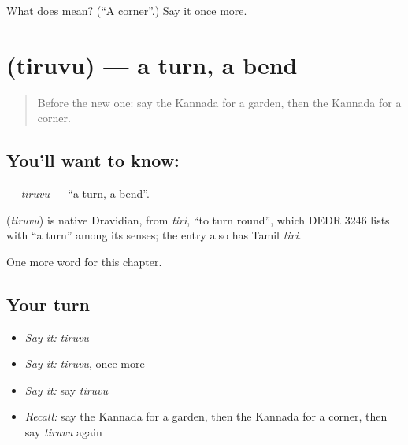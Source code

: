 \begin{tcolorbox}[breakable,colback=teal!4,colframe=teal!35!black,title={Before you move on}]
What does  mean? (\textquotedblleft{}A corner\textquotedblright{}.) Say it once more.
\end{tcolorbox}
\section[\texorpdfstring{\kn{ತಿರುವು} (tiruvu)}{ತಿರುವು (tiruvu)}]{ (tiruvu) — a turn, a bend}

\label{lesson:KA-C110-tiruvu}



\begin{quote}
Before the new one: say the Kannada for a garden, then the Kannada for a corner.
\end{quote}

\subsection*{You'll want to know: }
\textbf{} — \emph{tiruvu} — \textquotedblleft{}a turn, a bend\textquotedblright{}.

\begin{cousinweb}
\textbf{} (\emph{tiruvu}) is native Dravidian, from \emph{tiri}, \textquotedblleft{}to turn round\textquotedblright{}, which DEDR 3246 lists with \textquotedblleft{}a turn\textquotedblright{} among its senses; the entry also has Tamil \emph{tiri}.
\end{cousinweb}

\begin{grammarlens}[title={What you've built}]
One more word for this chapter.
\end{grammarlens}

\subsection*{Your turn}
\begin{itemize}
\raggedright
  \item \emph{Say it:} \emph{tiruvu}
  \item \emph{Say it:} \emph{tiruvu}, once more
  \item \emph{Say it:} say \emph{tiruvu}
  \item \emph{Recall:} say the Kannada for a garden, then the Kannada for a corner, then say \emph{tiruvu} again
\end{itemize}

